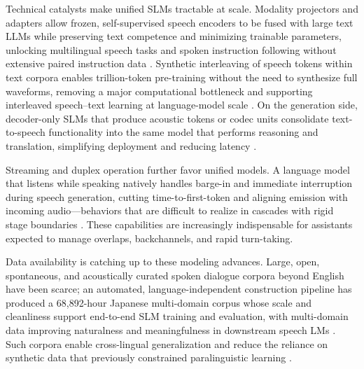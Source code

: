 \documentclass{article}
\begin{document}
Technical catalysts make unified SLMs tractable at scale. Modality projectors and adapters allow frozen, self-supervised speech encoders to be fused with large text LLMs while preserving text competence and minimizing trainable parameters, unlocking multilingual speech tasks and spoken instruction following without extensive paired instruction data \cite{wang2023slmbridgethingapbetweenspeechtextfoundat}. Synthetic interleaving of speech tokens within text corpora enables trillion-token pre-training without the need to synthesize full waveforms, removing a major computational bottleneck and supporting interleaved speech–text learning at language-model scale \cite{zeng2024scalingspeechtextpretrainingsyntheticint}. On the generation side, decoder-only SLMs that produce acoustic tokens or codec units consolidate text-to-speech functionality into the same model that performs reasoning and translation, simplifying deployment and reducing latency \cite{peng2024mslms2stmultitaskspeechlanguagemodeltext}.



Streaming and duplex operation further favor unified models. A language model that listens while speaking natively handles barge-in and immediate interruption during speech generation, cutting time-to-first-token and aligning emission with incoming audio—behaviors that are difficult to realize in cascades with rigid stage boundaries \cite{ma2024languagemodelcanlistenwhilespeaking}. These capabilities are increasingly indispensable for assistants expected to manage overlaps, backchannels, and rapid turn-taking.



Data availability is catching up to these modeling advances. Large, open, spontaneous, and acoustically curated spoken dialogue corpora beyond English have been scarce; an automated, language-independent construction pipeline has produced a 68,892-hour Japanese multi-domain corpus whose scale and cleanliness support end-to-end SLM training and evaluation, with multi-domain data improving naturalness and meaningfulness in downstream speech LMs \cite{nakata2024jchatjapaneselargescalespokendialoguecor}. Such corpora enable cross-lingual generalization and reduce the reliance on synthetic data that previously constrained paralinguistic learning \cite{wang2024blspemotowardsempatheticlargespeechlangu}.
\end{document}
